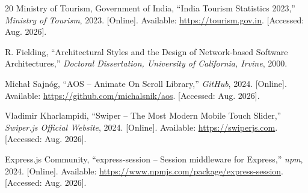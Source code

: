 \begin{thebibliography}{20}
Ministry of Tourism, Government of India, ``India Tourism Statistics 2023,'' \textit{Ministry of Tourism}, 2023. [Online]. Available: \url{https://tourism.gov.in}. [Accessed: Aug. 2026].

R. Fielding, ``Architectural Styles and the Design of Network-based Software Architectures,'' \textit{Doctoral Dissertation, University of California, Irvine}, 2000.

Micha\l{} Sajn\'og, ``AOS -- Animate On Scroll Library,'' \textit{GitHub}, 2024. [Online]. Available: \url{https://github.com/michalsnik/aos}. [Accessed: Aug. 2026].

Vladimir Kharlampidi, ``Swiper -- The Most Modern Mobile Touch Slider,'' \textit{Swiper.js Official Website}, 2024. [Online]. Available: \url{https://swiperjs.com}. [Accessed: Aug. 2026].

Express.js Community, ``express-session -- Session middleware for Express,'' \textit{npm}, 2024. [Online]. Available: \url{https://www.npmjs.com/package/express-session}. [Accessed: Aug. 2026].

\end{thebibliography}
